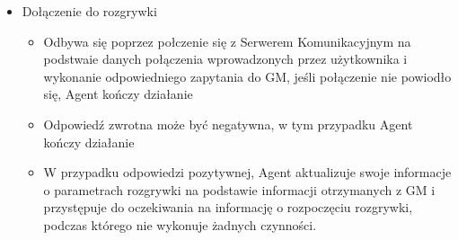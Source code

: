 \documentclass[../Dokumentacja.tex]{subfiles}
\begin{document}
\begin{itemize}
    \item Dołączenie do rozgrywki
    \begin{itemize}
        \item Odbywa się poprzez połczenie się z Serwerem Komunikacyjnym na podstwaie danych połączenia wprowadzonych przez użytkownika i wykonanie odpowiedniego zapytania do GM, jeśli połączenie nie powiodło się, Agent kończy działanie
        \item Odpowiedź zwrotna może być negatywna, w tym przypadku Agent kończy działanie
        \item W przypadku odpowiedzi pozytywnej, Agent aktualizuje swoje informacje o parametrach rozgrywki na podstawie informacji otrzymanych z GM i przystępuje do oczekiwania na informację o rozpoczęciu rozgrywki, podczas którego nie wykonuje żadnych czynności.
    \end{itemize}


\end{itemize}
\end{document}
